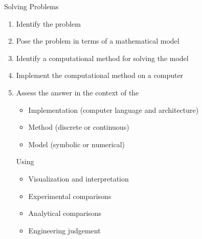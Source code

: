 \documentclass[xcolor=x11names,compress, handout]{beamer}
\renewcommand{\(}{\begin{columns}}
\renewcommand{\)}{\end{columns}}
\newcommand{\<}[1]{\begin{column}{#1}}
\renewcommand{\>}{\end{column}}
\begin{document}
\begin{frame}{Solving Problems}
\begin{enumerate}
\item Identify the problem
\item Pose the problem in terms of a mathematical model
\item Identify a computational method for solving the model
\item Implement the computational method on a computer
\item Assess the answer in the context of the
\begin{itemize}
\item Implementation (computer language and architecture)
\item Method (discrete or continuous)
\item Model (symbolic or numerical)
\end{itemize}
Using
\begin{itemize}
\item Visualization and interpretation
\item Experimental comparisons
\item Analytical comparisons
\item Engineering judgement
\end{itemize}
\end{enumerate}
\end{frame}
\end{document}
